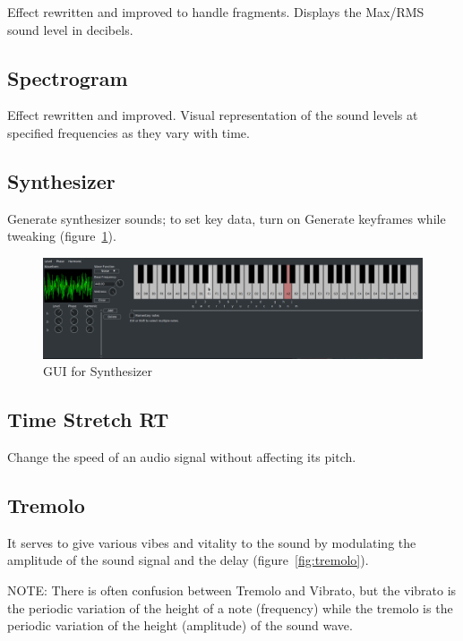 Effect rewritten and improved to handle fragments. Displays the Max/RMS sound level in decibels.

\subsection{Spectrogram}%
\label{sub:Spectrogram}

Effect rewritten and improved. Visual representation of the sound levels at specified frequencies as they vary with time.

\subsection{Synthesizer}%
\label{sub:Synthesizer}

Generate synthesizer sounds; to set key data, turn on Generate keyframes while tweaking (figure~\ref{fig:synthesizer}).

\begin{figure}[htpb]
    \centering
    \includegraphics[width=1.0\linewidth]{images/synthesizer.png}
    \caption{GUI for Synthesizer}
    \label{fig:synthesizer}
\end{figure}

\subsection{Time Stretch RT}%
\label{sub:time_stretch_rt}

Change the speed of an audio signal without affecting its pitch.

\subsection{Tremolo}%
\label{sub:tremolo}

It serves to give various vibes and vitality to the sound by modulating the amplitude of the sound signal and the delay (figure~\ref{fig:tremolo}).

NOTE: There is often confusion between Tremolo and Vibrato, but the vibrato is the periodic variation of the height of a note (frequency) while the tremolo is the periodic variation of the height (amplitude) of the sound wave.

